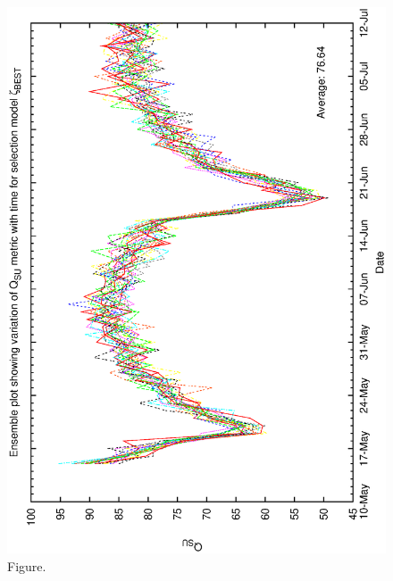 \documentclass[12pt,a4paper]{article}
\begin{document}
\begin{figure}[htbp]
 \begin{center}
  \includegraphics[scale=1.0, angle=0]{figures/best_ensemble.eps}
 \end{center}
  \caption[Figure.]
{Figure.}
\end{figure}
\clearpage
\end{document}
